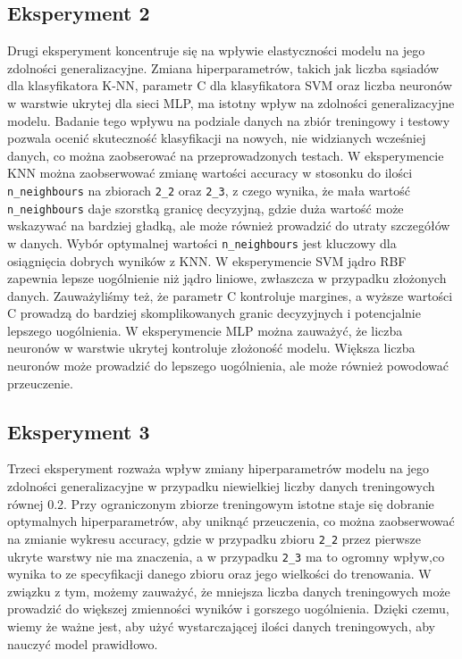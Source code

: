 \documentclass[12pt]{article}
\begin{document}
\subsection*{Eksperyment 2}
Drugi eksperyment koncentruje się na wpływie elastyczności modelu na 
jego zdolności generalizacyjne.
Zmiana hiperparametrów, takich jak liczba
sąsiadów dla klasyfikatora K-NN, parametr C dla klasyfikatora SVM oraz liczba 
neuronów w warstwie ukrytej dla sieci MLP, ma istotny wpływ na zdolności 
generalizacyjne modelu.
Badanie tego wpływu na podziale danych na zbiór treningowy
i testowy pozwala ocenić skuteczność klasyfikacji na nowych, 
nie widzianych wcześniej danych, co można zaobserować na przeprowadzonych testach.
W eksperymencie KNN można zaobserwować zmianę wartości accuracy w stosonku do ilości
\texttt{n\_neighbours} na zbiorach \texttt{2\_2} oraz \texttt{2\_3}, z czego wynika, że
mała wartość \texttt{n\_neighbours} daje szorstką granicę decyzyjną, gdzie duża wartość
może wskazywać na bardziej gładką, ale może również prowadzić do utraty szczegółów w danych.
Wybór optymalnej wartości \texttt{n\_neighbours} jest kluczowy dla osiągnięcia dobrych wyników z KNN. W eksperymencie SVM jądro RBF zapewnia lepsze uogólnienie niż jądro liniowe, zwłaszcza w przypadku złożonych danych.
Zauważyliśmy też, że parametr C kontroluje margines, a wyższe wartości C 
prowadzą do bardziej skomplikowanych granic decyzyjnych i 
potencjalnie lepszego uogólnienia.
W eksperymencie MLP można zauważyć, że liczba neuronów w warstwie ukrytej kontroluje złożoność modelu.
Większa liczba neuronów może prowadzić do lepszego uogólnienia, ale może również powodować przeuczenie.


\subsection*{Eksperyment 3}
Trzeci eksperyment rozważa wpływ zmiany hiperparametrów modelu na jego zdolności 
generalizacyjne w przypadku niewielkiej liczby danych treningowych równej 0.2.
Przy ograniczonym zbiorze treningowym istotne staje się dobranie optymalnych 
hiperparametrów, aby uniknąć przeuczenia, co można zaobserwować na zmianie 
wykresu accuracy, gdzie w przypadku zbioru \texttt{2\_2} przez pierwsze 
ukryte warstwy nie ma znaczenia, a w przypadku \texttt{2\_3} ma to ogromny
wpływ,co wynika to ze specyfikacji danego zbioru oraz jego wielkości do trenowania.
W związku z tym, możemy zauważyć, że mniejsza liczba danych treningowych może prowadzić do większej zmienności wyników i gorszego uogólnienia.
Dzięki czemu, wiemy że ważne jest, aby użyć wystarczającej ilości danych treningowych, 
aby nauczyć model prawidłowo. 
\end{document}
